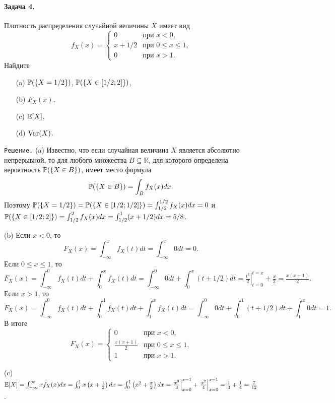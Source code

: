 \documentclass[12pt, a4paper]{article}\usepackage[]{graphicx}\usepackage[]{color}
\begin{document}
				\paragraph{Задача 4.}
				Плотность распределения случайной величины $X$ имеет вид
				\[
				f_X(x) =          \begin{cases}
				0     &   \text{при $x < 0$,} \\
				x + 1/2   &   \text{при $0 \leq x \leq 1$,} \\
				0     &   \text{при $x > 1$.}
				\end{cases}
				\]
				Найдите
				\begin{itemize}
					\item[(a)] $\P(\{X=1/2\})$, $\P(\{X \in [1/2;2]\})$,
					\item[(b)] $F_X(x)$,
					\item[(c)] $\E[X]$,
					\item[(d)] $\Var(X)$.
				\end{itemize}

				\verb"Решение." (a) Известно, что если случайная величина $X$ является абсолютно непрерывной, то для любого множества $B \subseteq \mathbb{R}$, для которого определена вероятность $\P(\{X \in B\})$, имеет место формула
				\[
				\P(\{X \in B\}) = \int_{B}f_X(x)dx \text{.}
				\]
				Поэтому $\P(\{X = 1/2\}) = \P(\{X \in [1/2;1/2]\}) = \int_{1/2}^{1/2}f_X(x)dx = 0$ и $\P(\{X \in [1/2;2]\}) = \int_{1/2}^{2}f_X(x)dx = \int_{1/2}^{1}(x+1/2)dx =5/8$.

				(b) Если $x < 0$, то
				\[
				F_X(x) = \int_{-\infty}^{x}f_X(t)dt = \int_{-\infty}^{x}0dt = 0 \text{.}
				\]
				Если $0 \leq x \leq 1$, то
				\[
				F_X(x) = \int_{-\infty}^{0}f_X(t)dt + \int_{0}^{x}f_X(t)dt= \int_{-\infty}^{0}0dt + \int_{0}^{x}(t+1/2)dt = \left.\tfrac{t^2}{2}\right|_{t=0}^{t=x} + \tfrac{x}{2} = \tfrac{x(x+1)}{2} \text{.}
				\]
				Если $x > 1$, то
				\[
				F_X(x) = \int_{-\infty}^{0}f_X(t)dt + \int_{0}^{1}f_X(t)dt + \int_{1}^{x}f_X(t)dt = \int_{-\infty}^{0}0dt + \int_{0}^{1}(t+1/2)dt + \int_{1}^{x}0dt = 1 \text{.}
				\]
				В итоге
				\[
				F_X(x) =
				\begin{cases}
				0                   &   \text{при $x < 0$,} \\
				\tfrac{x(x+1)}{2}   &   \text{при $0 \leq x \leq 1$,} \\
				1                   &   \text{при $x > 1$.}
				\end{cases}
				\]

				(c) $\E[X] = \int_{-\infty}^{\infty}xf_X(x)dx = \int_{0}^{1}x\left(x+\tfrac{1}{2}\right)dx = \int_{0}^{1}\left(x^2+\tfrac{x}{2}\right)dx = \left.\tfrac{x^3}{3}\right|_{x=0}^{x=1} + \left.\tfrac{x^2}{4}\right|_{x=0}^{x=1} = \tfrac{1}{3} + \tfrac{1}{4} = \tfrac{7}{12}$.
\end{document}
